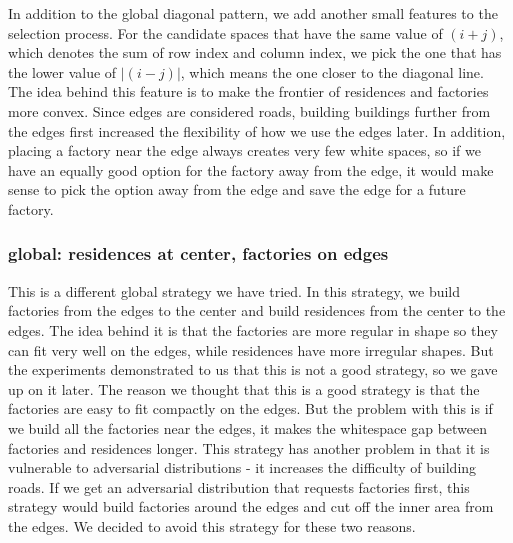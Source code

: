 In addition to the global diagonal pattern, we add another small features to the selection process. For the candidate spaces that have the same value of $(i+j)$, which denotes the sum of row index and column index, we pick the one that has the lower value of $|(i-j)|$, which means the one closer to the diagonal line. The idea behind this feature is to make the frontier of residences and factories more convex. Since edges are considered roads, building buildings further from the edges first increased the flexibility of how we use the edges later. In addition, placing a factory near the edge always creates very few white spaces, so if we have an equally good option for the factory away from the edge, it would make sense to pick the option away from the edge and save the edge for a future factory.
\subsubsection{global: residences at center, factories on edges}
This is a different global strategy we have tried. In this strategy, we build factories from the edges to the center and build residences from the center to the edges. The idea behind it is that the factories are more regular in shape so they can fit very well on the edges, while residences have more irregular shapes. But the experiments demonstrated to us that this is not a good strategy, so we gave up on it later. The reason we thought that this is a good strategy is that the factories are easy to fit compactly on the edges. But the problem with this is if we build all the factories near the edges, it makes the whitespace gap between factories and residences longer. This strategy has another problem in that it is vulnerable to adversarial distributions - it increases the difficulty of building roads. If we get an adversarial distribution that requests factories first, this strategy would build factories around the edges and cut off the inner area from the edges. We decided to avoid this strategy for these two reasons.
